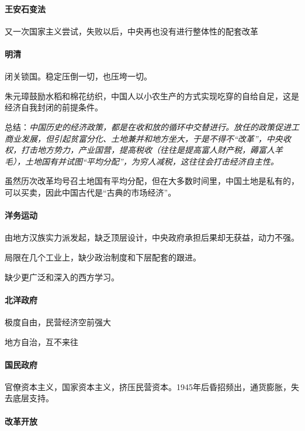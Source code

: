 \paragraph{王安石变法}

又一次国家主义尝试，失败以后，中央再也没有进行整体性的配套改革

\paragraph{明清}

闭关锁国。稳定压倒一切，也压垮一切。

朱元璋鼓励水稻和棉花纺织，中国人以小农生产的方式实现吃穿的自给自足，这是经济自我封闭的前提条件。

总结：\emph{中国历史的经济政策，都是在收和放的循环中交替进行。放任的政策促进工商业发展，但引起贫富分化、土地兼并和地方坐大，于是不得不“改革”，中央收权，打击地方势力，产业国营，提高税收（往往是提高富人财产税，薅富人羊毛），土地国有并试图“平均分配”，为穷人减税，这往往会打击经济自主性。}

虽然历次改革均号召土地国有平均分配，但在大多数时间里，中国土地是私有的，可以买卖，因此中国古代是“古典的市场经济”。

\paragraph{洋务运动}

由地方汉族实力派发起，缺乏顶层设计，中央政府承担后果却无获益，动力不强。

局限在几个工业上，缺少政治制度和下层配套的跟进。

缺少更广泛和深入的西方学习。

\paragraph{北洋政府}

极度自由，民营经济空前强大

地方自治，互不来往

\paragraph{国民政府}

官僚资本主义，国家资本主义，挤压民营资本。1945年后昏招频出，通货膨胀，失去底层支持。

\paragraph{改革开放}

